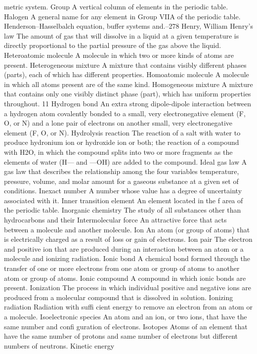 \documentclass[10pt, roman]{article}
\begin{document}
metric system. Group A vertical column of elements in the periodic table. Halogen A general name for any element in Group VIIA of the periodic table. Henderson–Hasselbalch equation, buffer systems and.–278 Henry, 
William Henry’s law The amount of gas that will dissolve in a liquid at a given temperature is directly proportional to the partial pressure of the gas above the liquid. Heteroatomic molecule A molecule in which two 
or more kinds of atoms are present. Heterogeneous mixture A mixture that contains visibly different phases (parts), each of which has different properties. Homoatomic molecule A molecule in which all atoms present are 
of the same kind. Homogeneous mixture A mixture that contains only one visibly distinct phase (part), which has uniform properties throughout. 11 Hydrogen bond An extra strong dipole-dipole interaction between a 
hydrogen atom covalently bonded to a small, very electronegative element (F, O, or N) and a lone pair of electrons on another small, very electronegative element (F, O, or N). Hydrolysis reaction The reaction of 
a salt with water to produce hydronium ion or hydroxide ion or both; the reaction of a compound with H2O, in which the compound splits into two or more fragments as the elements of water (H— and —OH) are added to 
the compound. Ideal gas law A gas law that describes the relationship among the four variables temperature, pressure, volume, and molar amount for a gaseous substance at a given set of conditions. Inexact number A 
number whose value has a degree of uncertainty associated with it. Inner transition element An element located in the f area of the periodic table. Inorganic chemistry The study of all substances other than 
hydrocarbons and their Intermolecular force An attractive force that acts between a molecule and another molecule. Ion An atom (or group of atoms) that is electrically charged as a result of loss or gain of 
electrons. Ion pair The electron and positive ion that are produced during an interaction between an atom or a molecule and ionizing radiation. Ionic bond A chemical bond formed through the transfer of one or more 
electrons from one atom or group of atoms to another atom or group of atoms. Ionic compound A compound in which ionic bonds are present. Ionization The process in which individual positive and negative ions are 
produced from a molecular compound that is dissolved in solution. Ionizing radiation Radiation with suffi cient energy to remove an electron from an atom or a molecule. Isoelectronic species An atom and an ion, or 
two ions, that have the same number and confi guration of electrons. Isotopes Atoms of an element that have the same number of protons and same number of electrons but different numbers of neutrons. Kinetic energy 
\end{document}

